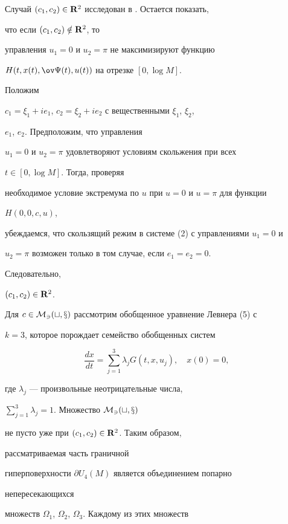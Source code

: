 \begin{pf}


Случай $(c_1,c_2)\in\bold R^2$ исследован в \cite{3}. Остается показать,


что если $(c_1,c_2)\notin\bold R^2$, то


управления $u_1=0$ и $u_2=\pi$ не максимизируют функцию


$H(t,x(t),\ov\Psi(t),u(t))$ на отрезке $[0,\log M]$.


Положим


$c_1=\xi_1+i e_1$, $c_2=\xi_2+i e_2$ с вещественными $\xi_1$, $\xi_2$,


$e_1$, $e_2$. Предположим, что управления


$u_1=0$ и $u_2=\pi$ удовлетворяют условиям скольжения при всех


$t\in[0,\log M]$. Тогда, проверяя


необходимое условие экстремума по $u$ при $u=0$ и $u=\pi$ для функции


$H(0,0,c,u)$,


убеждаемся, что скользящий режим в системе (2) с управлениями $u_1=0$ и


$u_2=\pi$ возможен только в том случае, если $e_1=e_2=0$.


Следовательно,


$(c_1,c_2)\in\bold R^2$.


\end{pf}





Для $c\in\cal M_3(t,x)$ рассмотрим обобщенное уравнение Левнера (5) с


$k=3$, которое порождает семейство обобщенных систем


$$


\frac{dx}{dt}=\sum^3_{j=1}\lambda_j G(t,x,u_j),\quad x(0)=0,


$$


где $\lambda_j$ --- произвольные неотрицательные числа,


$\sum\limits^3_{j=1}\lambda_j=1$. Множество $\cal M_3(t,x)$


не пусто уже при $(c_1,c_2)\in\bold R^2$. Таким образом,


рассматриваемая часть граничной


гиперповерхности $\partial U_4(M)$ является объединением попарно


непересекающихся


множеств $\Omega_1$, $\Omega_2$, $\Omega_3$. Каждому из этих множеств


